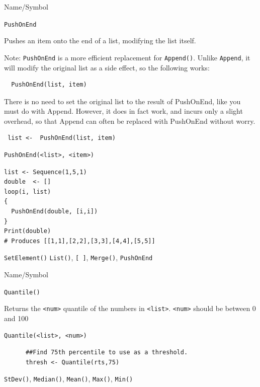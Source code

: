 \begin{desc}{Name/Symbol}
\item[Name/Symbol]  	\verb+PushOnEnd+
  
\item[Description]  	Pushes an item onto the end of a list, modifying the list itself.

Note: \texttt{PushOnEnd} is a more efficient replacement for \texttt{Append()}. Unlike \texttt{Append}, it will modify the original list as a side effect, so the following works:

\begin{verbatim}
  PushOnEnd(list, item)
\end{verbatim}
There is no need to set the original list to the result of PushOnEnd, like you must do with Append.  However, it does in fact work, and incurs only a slight overhead, so that Append can often be replaced with PushOnEnd without worry.
\begin{verbatim}
 list <-  PushOnEnd(list, item)
\end{verbatim}

\item[Usage] 
\begin{verbatim}
PushOnEnd(<list>, <item>)
\end{verbatim}

\item[Example]
\begin{verbatim}
list <- Sequence(1,5,1)
double  <- []
loop(i, list)
{
  PushOnEnd(double, [i,i])
}
Print(double)
# Produces [[1,1],[2,2],[3,3],[4,4],[5,5]]

\end{verbatim}

\item[See Also]  \verb+SetElement()+ \verb+List()+, \verb+[ ]+, \verb+Merge()+, \verb+PushOnEnd+
\end{desc}


\vfill
\newpage
{}
\vfill


\begin{desc}{Name/Symbol}
\item[Name/Symbol]	\verb+Quantile()+

\item[Description]	Returns the \verb+<num>+ quantile of
		the numbers in \verb+<list>+. \verb+<num>+ should be  between
        0 and 100

\item[Usage]		
\begin{verbatim}
Quantile(<list>, <num>)
\end{verbatim}

\item[Example]	
 \begin{verbatim}
      ##Find 75th percentile to use as a threshold.
      thresh <- Quantile(rts,75) 
 \end{verbatim}
\item[See Also]	\verb+StDev()+, \verb+Median()+, \verb+Mean()+, \verb+Max()+, \verb+Min()+
\end{desc}

